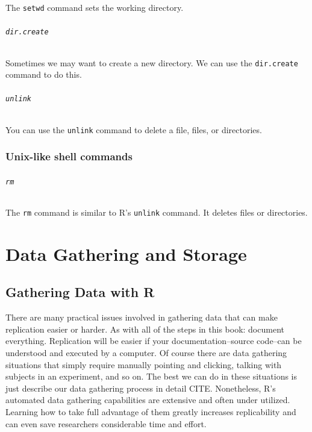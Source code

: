 \documentclass[ChapterTOCs,krantz1]{krantz}\usepackage{graphicx, color}
\begin{document}
The {\tt{setwd}} command sets the working directory.

\paragraph{{\tt{dir.create}}}

Sometimes we may want to create a new directory. We can use the {\tt{dir.create}} command to do this.

\paragraph{{\tt{unlink}}}

You can use the {\tt{unlink}} command to delete a file, files, or directories. 

\section{Unix-like shell commands} 

\paragraph{{\tt{rm}}}

The {\tt{rm}} command is similar to R's {\tt{unlink}} command. It deletes files or directories.


\part{Data Gathering and Storage}





\chapter{Gathering Data with R}\label{DataGather}

There are many practical issues involved in gathering data that can make replication easier or harder. As with all of the steps in this book: document everything. Replication will be easier if your documentation--source code--can be understood and executed by a computer. Of course there are data gathering situations that simply require manually pointing and clicking, talking with subjects in an experiment, and so on. The best we can do in these situations is just describe our data gathering process in detail CITE. Nonetheless, R's automated data gathering capabilities are extensive and often under utilized. Learning how to take full advantage of them greatly increases replicability and can even save researchers considerable time and effort.
\end{document}

